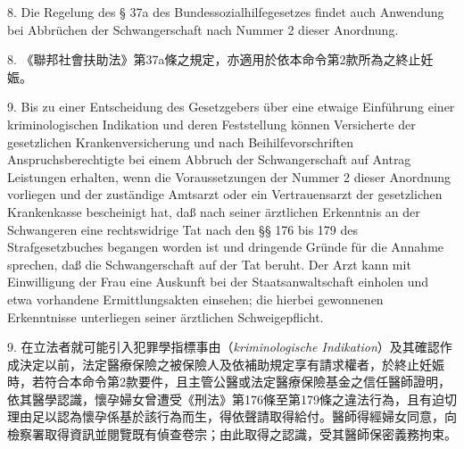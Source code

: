\documentclass[12pt]{article}
\begin{document}
\begin{sourcepara}[title={原文主文 II.8}]
8. Die Regelung des § 37a des Bundessozialhilfegesetzes findet auch Anwendung bei Abbrüchen der Schwangerschaft nach Nummer 2 dieser Anordnung.
\end{sourcepara}
\begin{transpara}
8. 《聯邦社會扶助法》第37a條之規定，亦適用於依本命令第2款所為之終止妊娠。
\end{transpara}

\begin{sourcepara}[title={原文主文 II.9}]
9. Bis zu einer Entscheidung des Gesetzgebers über eine etwaige Einführung einer kriminologischen Indikation und deren Feststellung können Versicherte der gesetzlichen Krankenversicherung und nach Beihilfevorschriften Anspruchsberechtigte bei einem Abbruch der Schwangerschaft auf Antrag Leistungen erhalten, wenn die Voraussetzungen der Nummer 2 dieser Anordnung vorliegen und der zuständige Amtsarzt oder ein Vertrauensarzt der gesetzlichen Krankenkasse bescheinigt hat, daß nach seiner ärztlichen Erkenntnis an der Schwangeren eine rechtswidrige Tat nach den §§ 176 bis 179 des Strafgesetzbuches begangen worden ist und dringende Gründe für die Annahme sprechen, daß die Schwangerschaft auf der Tat beruht. Der Arzt kann mit Einwilligung der Frau eine Auskunft bei der Staatsanwaltschaft einholen und etwa vorhandene Ermittlungsakten einsehen; die hierbei gewonnenen Erkenntnisse unterliegen seiner ärztlichen Schweigepflicht.
\end{sourcepara}
\begin{transpara}
9. 在立法者就可能引入犯罪學指標事由（\textit{kriminologische Indikation}）及其確認作成決定以前，法定醫療保險之被保險人及依補助規定享有請求權者，於終止妊娠時，若符合本命令第2款要件，且主管公醫或法定醫療保險基金之信任醫師證明，依其醫學認識，懷孕婦女曾遭受《刑法》第176條至第179條之違法行為，且有迫切理由足以認為懷孕係基於該行為而生，得依聲請取得給付。醫師得經婦女同意，向檢察署取得資訊並閱覽既有偵查卷宗；由此取得之認識，受其醫師保密義務拘束。
\end{transpara}

\startrandnumbers

\end{document}

